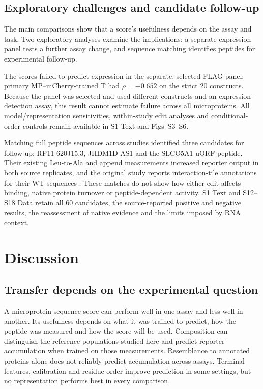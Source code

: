 \documentclass[11pt,a4paper]{article}
\begin{document}
\subsection{Exploratory challenges and candidate follow-up}
The main comparisons show that a score's usefulness depends on the
assay and task. Two exploratory analyses examine the implications: a separate
expression panel tests a further assay change, and sequence matching
identifies peptides for experimental follow-up.

The scores failed to predict expression in the separate, selected FLAG panel:
primary MP--mCherry-trained T had $\rho=-0.652$ on the strict 20 constructs.
Because the panel was selected and used different constructs and an expression-detection assay, this result cannot estimate failure across all microproteins. All model/representation sensitivities,
within-study edit analyses and conditional-order controls remain available
in S1 Text and Figs~S3--S6.

Matching full peptide sequences across studies identified three candidates for follow-up:
RP11-620J15.3, JHDM1D-AS1 and the SLCO5A1 uORF peptide. Their existing
Leu-to-Ala and append measurements increased reporter output in both source
replicates, and the original study reports interaction-tile annotations for their WT sequences
\cite{guo,sandmann}. These matches do not show how either edit affects binding, native protein turnover or peptide-dependent activity. S1 Text and S12--S18 Data retain all 60 candidates, the source-reported positive and negative results, the reassessment of native evidence and the limits imposed by RNA context.

\section{Discussion}
\subsection{Transfer depends on the experimental question}
A microprotein sequence score can perform well in one assay and less well in another. Its usefulness depends on what it was trained to predict, how the peptide was measured and how the score will be used. Composition can distinguish the reference populations studied here and predict reporter accumulation when trained on those measurements. Resemblance to annotated proteins alone does not reliably predict accumulation across assays. Terminal features, calibration and residue order improve prediction in some settings, but no representation performs best in every comparison.
\end{document}
